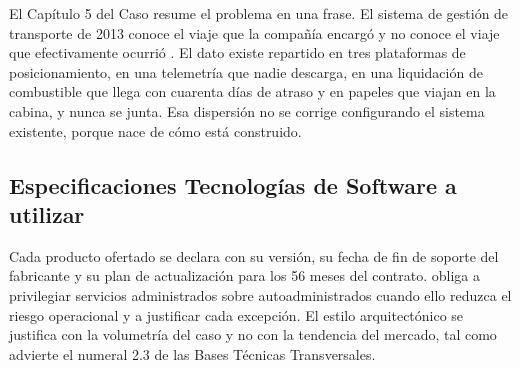 El Capítulo 5 del Caso resume el problema en una frase. El sistema de gestión de transporte de 2013
conoce el viaje que la compañía encargó y no conoce el viaje que efectivamente ocurrió
. El dato existe repartido en tres plataformas de posicionamiento, en una
telemetría que nadie descarga, en una liquidación de combustible que llega con cuarenta días de
atraso y en papeles que viajan en la cabina, y nunca se junta. Esa dispersión no se corrige
configurando el sistema existente, porque nace de cómo está construido.


\subsection{Especificaciones Tecnologías de Software a utilizar}\label{sec:4-software}

Cada producto ofertado se declara con su versión, su fecha de fin de soporte del fabricante y su plan
de actualización para los 56 meses del contrato.  obliga a privilegiar servicios
administrados sobre autoadministrados cuando ello reduzca el riesgo operacional y a justificar cada
excepción. El estilo arquitectónico se justifica con la volumetría del caso y no con la tendencia del
mercado, tal como advierte el numeral 2.3 de las Bases Técnicas Transversales.



